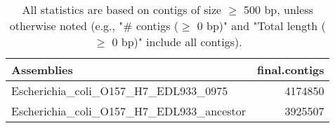 \documentclass[12pt,a4paper]{article}
\begin{document}
\begin{table}[ht]
\begin{center}
\caption{All statistics are based on contigs of size $\geq$ 500 bp, unless otherwise noted (e.g., "\# contigs ($\geq$ 0 bp)" and "Total length ($\geq$ 0 bp)" include all contigs).}
\begin{tabular}{|l*{1}{|r}|}
\hline
Assemblies & final.contigs \\ \hline
Escherichia\_coli\_O157\_H7\_EDL933\_0975 & 4174850 \\ \hline
Escherichia\_coli\_O157\_H7\_EDL933\_ancestor & 3925507 \\ \hline
\end{tabular}
\end{center}
\end{table}
\end{document}
